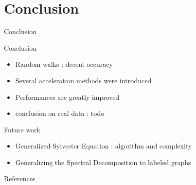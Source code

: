 \documentclass[compress]{beamer}
\begin{document}
\section{Conclusion}
\begin{frame}{Conclusion}
\begin{block}{Conclusion}
	\begin{itemize}
		\item Random walks : decent accuracy
		\item Several acceleration methods were introduced
		\item Performances are greatly improved
		\item conclusion on real data : todo
	\end{itemize}
\end{block}
\begin{block}{Future work}
	\begin{itemize}
		\item Generalized Sylvester Equation : algorithm and complexity
		\item Generalizing the Spectral Decomposition to labeled graphs
	\end{itemize}
\end{block}
\end{frame}

\renewcommand\bibsection{\subsection{\refname}}
\begin{frame}{References}
\nocite{bondy1976graph,borgwardt_protein_2005,imrich2000product,burges_tutorial_1998,vapnik_statistical_1998,nesterov_lectures_2018,shervashidze_efficient_2009}
\footnotesize

\end{frame}

\appendix
\end{document}
